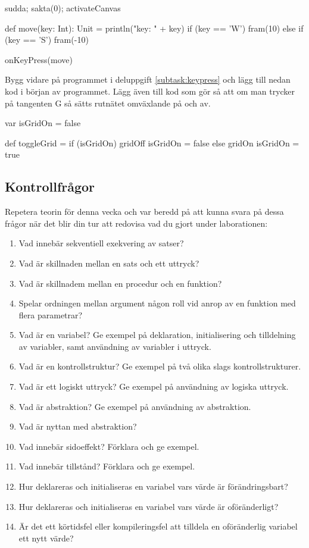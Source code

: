 \begin{Code}
sudda; sakta(0); activateCanvas

def move(key: Int): Unit = {
  println("key: " + key)
  if (key == 'W') fram(10)
  else if (key == 'S') fram(-10)
}

onKeyPress(move)
\end{Code}

\Subtask Bygg vidare på programmet i deluppgift \ref{subtask:keypress} och lägg till nedan kod i början av programmet. Lägg även till kod som gör så att om man trycker på tangenten G så sätts rutnätet omväxlande på och av.

\begin{Code}
var isGridOn = false

def toggleGrid =
  if (isGridOn) {
    gridOff
    isGridOn = false
  } else {
    gridOn
    isGridOn = true
  }
\end{Code}



\subsection{Kontrollfrågor}\Checkpoint

\noindent Repetera teorin för denna vecka och var beredd på att kunna svara på dessa frågor när det blir din tur att redovisa vad du gjort under laborationen:

\begin{enumerate}
\item Vad innebär sekventiell exekvering av satser?
\item Vad är skillnaden mellan en sats och ett uttryck?
\item Vad är skillnadem mellan en procedur och en funktion?
\item Spelar ordningen mellan argument någon roll vid anrop av en funktion med flera parametrar?
\item Vad är en variabel? Ge exempel på deklaration, initialisering och tilldelning av variabler, samt användning av variabler i uttryck.
\item Vad är en kontrollstruktur? Ge exempel på två olika slags kontrollstrukturer.
\item Vad är ett logiskt uttryck? Ge exempel på användning av logiska uttryck.
\item Vad är abstraktion? Ge exempel på användning av abstraktion.
\item Vad är nyttan med abstraktion?
\item Vad innebär sidoeffekt? Förklara och ge exempel.
\item Vad innebär tillstånd? Förklara och ge exempel.
\item Hur deklareras och initialiseras en variabel vars värde är förändringsbart? 
\item Hur deklareras och initialiseras en variabel vars värde är oföränderligt? 
\item Är det ett körtidsfel eller kompileringsfel att tilldela en oföränderlig variabel ett nytt värde?
\end{enumerate}


